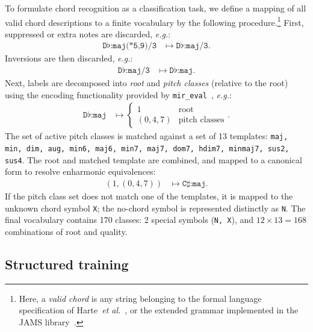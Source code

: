 \documentclass{article}
\def\eg{\emph{e.g.\/}}
\begin{document}
To formulate chord recognition as a classification task, we define a mapping of all valid chord descriptions to a finite vocabulary by the following procedure.\footnote{Here, a \emph{valid chord} is any string belonging to the formal language specification of Harte~\emph{et al.}~\cite{harte2005symbolic}, or the extended grammar implemented in the JAMS library~\cite{humphrey2014jams}.}
First, suppressed or extra notes are discarded, \eg:
\begin{align*}
    \texttt{D}\flat\texttt{:maj(*5,9)/3} &\mapsto \texttt{D}\flat\texttt{:maj/3}.
\end{align*}
Inversions are then discarded, \eg:
\begin{align*}
    \texttt{D}\flat\texttt{:maj/3} &\mapsto \texttt{D}\flat\texttt{:maj}.
\end{align*}
Next, labels are decomposed into \emph{root} and \emph{pitch classes} (relative to the root) using the encoding functionality provided by \texttt{mir\_eval}~\cite{raffel2014mir_eval}, \eg:
\begin{align*}
    \texttt{D}\flat\texttt{:maj} &\mapsto \begin{cases}
        1 & \text{root}\\
        (0, 4, 7) & \text{pitch classes}
    \end{cases}.
\end{align*}
The set of active pitch classes is matched against a set of 13 templates: \texttt{maj, min, dim, aug, min6, maj6, min7, maj7, dom7, hdim7, minmaj7, sus2, sus4}.
The root and matched template are combined, and mapped to a canonical form to resolve enharmonic equivalences:
\begin{align*}
    \left(1, (0, 4, 7) \right) &\mapsto \texttt{C}\sharp\texttt{:maj}.
\end{align*}
If the pitch class set does not match one of the templates, it is mapped to the unknown chord symbol \texttt{X}; the no-chord symbol is represented distinctly as \texttt{N}.
The final vocabulary contains 170 classes: 2 special symbols (\texttt{N, X}), and $12\times13=168$ combinations of root and quality.


\subsection{Structured training}
\label{sec:encoding}

%       
\end{document}
